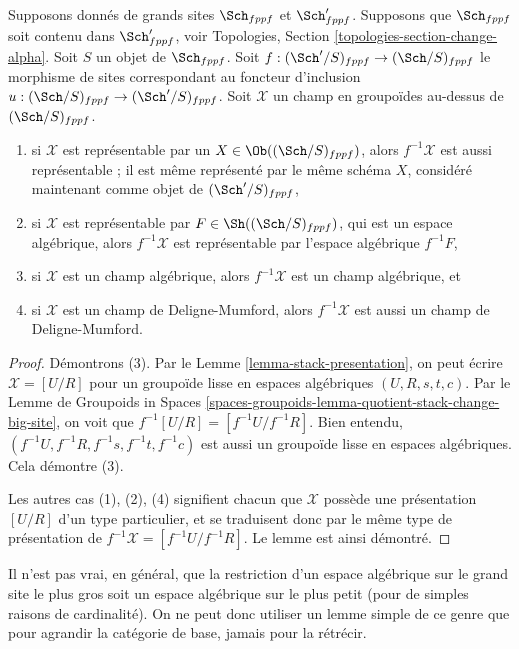 \begin{lemma}
\label{lemma-change-big-site}
Supposons donnés de grands sites $\Sch_{fppf}$ et $\Sch'_{fppf}$.
Supposons que $\Sch_{fppf}$ soit contenu dans $\Sch'_{fppf}$,
voir Topologies, Section \ref{topologies-section-change-alpha}.
Soit $S$ un objet de $\Sch_{fppf}$.
Soit $f : (\Sch'/S)_{fppf} \to (\Sch/S)_{fppf}$ le morphisme
de sites correspondant au foncteur d'inclusion
$u : (\Sch/S)_{fppf} \to (\Sch'/S)_{fppf}$.
Soit $\mathcal{X}$ un champ en groupoïdes au-dessus de $(\Sch/S)_{fppf}$.
\begin{enumerate}
\item si $\mathcal{X}$ est représentable par un
$X \in \Ob((\Sch/S)_{fppf})$, alors
$f^{-1}\mathcal{X}$ est aussi représentable ; il est même représenté par le
même schéma $X$, considéré maintenant comme objet de $(\Sch'/S)_{fppf}$,
\item si $\mathcal{X}$ est représentable par
$F \in \Sh((\Sch/S)_{fppf})$, qui est
un espace algébrique, alors $f^{-1}\mathcal{X}$ est représentable
par l'espace algébrique $f^{-1}F$,
\item si $\mathcal{X}$ est un champ algébrique, alors $f^{-1}\mathcal{X}$
est un champ algébrique, et
\item si $\mathcal{X}$ est un champ de Deligne-Mumford, alors $f^{-1}\mathcal{X}$
est aussi un champ de Deligne-Mumford.
\end{enumerate}
\end{lemma}

\begin{proof}
Démontrons (3). Par le
Lemme \ref{lemma-stack-presentation},
on peut écrire $\mathcal{X} = [U/R]$ pour un groupoïde lisse
en espaces algébriques $(U, R, s, t, c)$. Par le
Lemme de Groupoids in Spaces
\ref{spaces-groupoids-lemma-quotient-stack-change-big-site},
on voit que $f^{-1}[U/R] = [f^{-1}U/f^{-1}R]$.
Bien entendu, $(f^{-1}U, f^{-1}R, f^{-1}s, f^{-1}t, f^{-1}c)$
est aussi un groupoïde lisse en espaces algébriques. Cela démontre (3).

\medskip\noindent
Les autres cas (1), (2), (4) signifient chacun que $\mathcal{X}$ possède
une présentation $[U/R]$ d'un type particulier, et se traduisent donc par le
même type de présentation de $f^{-1}\mathcal{X} = [f^{-1}U/f^{-1}R]$.
Le lemme est ainsi démontré.
\end{proof}

\noindent
Il n'est pas vrai, en général, que la restriction d'un espace algébrique
sur le grand site le plus gros soit un espace algébrique sur le plus petit (pour de simples
raisons de cardinalité). On ne peut donc utiliser un lemme simple de ce
genre que pour agrandir la catégorie de base, jamais pour la rétrécir.

